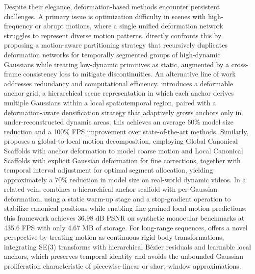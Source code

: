 \documentclass[11pt]{article}
\begin{document}
Despite their elegance, deformation-based methods encounter persistent challenges. A primary issue is optimization difficulty in scenes with high-frequency or abrupt motions, where a single unified deformation network struggles to represent diverse motion patterns. \cite{ref327} directly confronts this by proposing a motion-aware partitioning strategy that recursively duplicates deformation networks for temporally segmented groups of high-dynamic Gaussians while treating low-dynamic primitives as static, augmented by a cross-frame consistency loss to mitigate discontinuities. An alternative line of work addresses redundancy and computational efficiency. \cite{ref328} introduces a deformable anchor grid, a hierarchical scene representation in which each anchor derives multiple Gaussians within a local spatiotemporal region, paired with a deformation-aware densification strategy that adaptively grows anchors only in under-reconstructed dynamic areas; this achieves an average 60\% model size reduction and a 100\% FPS improvement over state-of-the-art methods. Similarly, \cite{ref329} proposes a global-to-local motion decomposition, employing Global Canonical Scaffolds with anchor deformation to model coarse motion and Local Canonical Scaffolds with explicit Gaussian deformation for fine corrections, together with temporal interval adjustment for optimal segment allocation, yielding approximately a 70\% reduction in model size on real-world dynamic videos. In a related vein, \cite{ref330} combines a hierarchical anchor scaffold with per-Gaussian deformation, using a static warm-up stage and a stop-gradient operation to stabilize canonical positions while enabling fine-grained local motion predictions; this framework achieves 36.98 dB PSNR on synthetic monocular benchmarks at 435.6 FPS with only 4.67 MB of storage. For long-range sequences, \cite{ref331} offers a novel perspective by treating motion as continuous rigid-body transformations, integrating SE(3) transforms with hierarchical Bézier residuals and learnable local anchors, which preserves temporal identity and avoids the unbounded Gaussian proliferation characteristic of piecewise-linear or short-window approximations.
\end{document}
